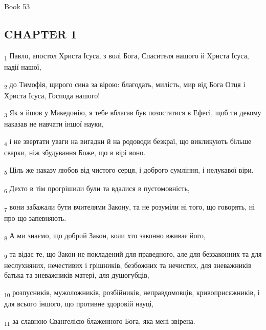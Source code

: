 Book 53
\subsection{CHAPTER 1}
\begin{tcolorbox}
\textsubscript{1} Павло, апостол Христа Ісуса, з волі Бога, Спасителя нашого й Христа Ісуса, надії нашої,
\end{tcolorbox}
\begin{tcolorbox}
\textsubscript{2} до Тимофія, щирого сина за вірою: благодать, милість, мир від Бога Отця і Христа Ісуса, Господа нашого!
\end{tcolorbox}
\begin{tcolorbox}
\textsubscript{3} Як я йшов у Македонію, я тебе вблагав був позостатися в Ефесі, щоб ти декому наказав не навчати іншої науки,
\end{tcolorbox}
\begin{tcolorbox}
\textsubscript{4} і не звертати уваги на вигадки й на родоводи безкраї, що викликують більше сварки, ніж збудування Боже, що в вірі воно.
\end{tcolorbox}
\begin{tcolorbox}
\textsubscript{5} Ціль же наказу любов від чистого серця, і доброго сумління, і нелукавої віри.
\end{tcolorbox}
\begin{tcolorbox}
\textsubscript{6} Дехто в тім прогрішили були та вдалися в пустомовність,
\end{tcolorbox}
\begin{tcolorbox}
\textsubscript{7} вони забажали бути вчителями Закону, та не розуміли ні того, що говорять, ні про що запевняють.
\end{tcolorbox}
\begin{tcolorbox}
\textsubscript{8} А ми знаємо, що добрий Закон, коли хто законно вживає його,
\end{tcolorbox}
\begin{tcolorbox}
\textsubscript{9} та відає те, що Закон не покладений для праведного, але для беззаконних та для неслухняних, нечестивих і грішників, безбожних та нечистих, для зневажників батька та зневажників матері, для душогубців,
\end{tcolorbox}
\begin{tcolorbox}
\textsubscript{10} розпусників, мужоложників, розбійників, неправдомовців, кривоприсяжників, і для всього іншого, що противне здоровій науці,
\end{tcolorbox}
\begin{tcolorbox}
\textsubscript{11} за славною Євангелією блаженного Бога, яка мені звірена.
\end{tcolorbox}
